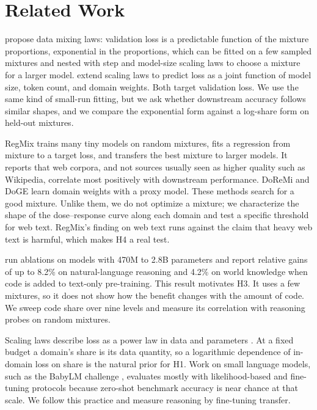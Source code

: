\section{Related Work}
\label{sec:related}

\citet{ye2025datamixing} propose data mixing laws: validation loss is a predictable function of the mixture proportions, exponential in the proportions, which can be fitted on a few sampled mixtures and nested with step and model-size scaling laws to choose a mixture for a larger model.
\citet{shukor2025scaling} extend scaling laws to predict loss as a joint function of model size, token count, and domain weights.
Both target validation loss.
We use the same kind of small-run fitting, but we ask whether downstream accuracy follows similar shapes, and we compare the exponential form against a log-share form on held-out mixtures.

RegMix \citep{liu2025regmix} trains many tiny models on random mixtures, fits a regression from mixture to a target loss, and transfers the best mixture to larger models.
It reports that web corpora, and not sources usually seen as higher quality such as Wikipedia, correlate most positively with downstream performance.
DoReMi \citep{xie2023doremi} and DoGE \citep{fan2024doge} learn domain weights with a proxy model.
These methods search for a good mixture.
Unlike them, we do not optimize a mixture; we characterize the shape of the dose--response curve along each domain and test a specific threshold for web text.
RegMix's finding on web text runs against the claim that heavy web text is harmful, which makes H4 a real test.

\citet{aryabumi2025code} run ablations on models with 470M to 2.8B parameters and report relative gains of up to 8.2\% on natural-language reasoning and 4.2\% on world knowledge when code is added to text-only pre-training.
This result motivates H3.
It uses a few mixtures, so it does not show how the benefit changes with the amount of code.
We sweep code share over nine levels and measure its correlation with reasoning probes on random mixtures.

Scaling laws describe loss as a power law in data and parameters \citep{kaplan2020scaling,hoffmann2022chinchilla}.
At a fixed budget a domain's share is its data quantity, so a logarithmic dependence of in-domain loss on share is the natural prior for H1.
Work on small language models, such as the BabyLM challenge \citep{warstadt2023babylm}, evaluates mostly with likelihood-based and fine-tuning protocols because zero-shot benchmark accuracy is near chance at that scale.
We follow this practice and measure reasoning by fine-tuning transfer.
